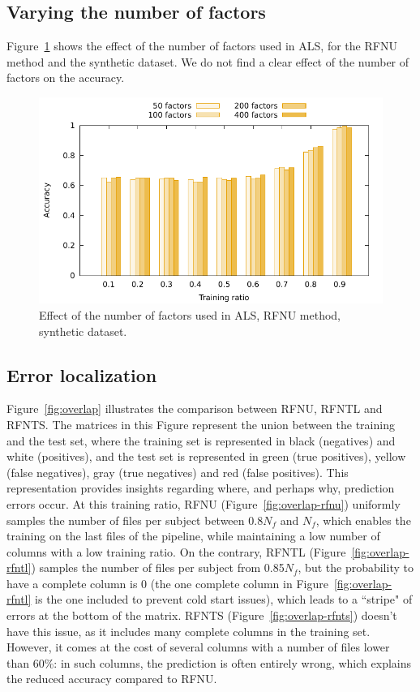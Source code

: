 \documentclass[10pt, conference, compsocconf]{IEEEtran}
\begin{document}
\subsection{Varying the number of factors}
Figure~\ref{fig:factors} shows the effect of the number of factors used 
in ALS, for the RFNU method and the synthetic dataset. We do not find a 
clear effect of the number of factors on the accuracy.
\begin{figure}[h]
\includegraphics[width=\columnwidth]{data/results/means_of_results/ALS/Synthetic/8type-RFNU-Differ-Num-Factors/ALS-8-types-ranks.pdf}
\caption{Effect of the number of factors used in ALS, RFNU method, synthetic dataset.}
\label{fig:factors}
\end{figure}

\subsection{Error localization}
Figure~\ref{fig:overlap} illustrates the comparison between RFNU, RFNTL 
and RFNTS. The matrices in this Figure represent the union between the 
training and the test set, where the training set is represented in 
black (negatives) and white (positives), and the test set is 
represented in green (true positives), yellow (false negatives), gray 
(true negatives) and red (false positives). This representation 
provides insights regarding where, and perhaps why, prediction errors 
occur. At this training ratio, RFNU (Figure~\ref{fig:overlap-rfnu}) 
uniformly samples the number of files per subject between 0.8$N_f$ and 
$N_f$, which enables the training on the last 
files of the pipeline, while maintaining a low number of columns with 
a low training ratio. On the contrary, RFNTL 
(Figure~\ref{fig:overlap-rfntl}) samples the number of files per 
subject from 0.85$N_f$, but the probability to have a complete column 
is 0 (the one complete column in Figure~\ref{fig:overlap-rfntl} is the 
one included to prevent cold start issues), which leads to a ``stripe" 
of errors at the bottom of the matrix. RFNTS 
(Figure~\ref{fig:overlap-rfnts}) doesn't have this issue, as it 
includes many complete columns in the training set. However, it comes at 
the cost of several columns with a number of files lower than 
60\%: in such columns, the prediction is often entirely wrong, which explains
the reduced accuracy compared to RFNU.
\end{document}
